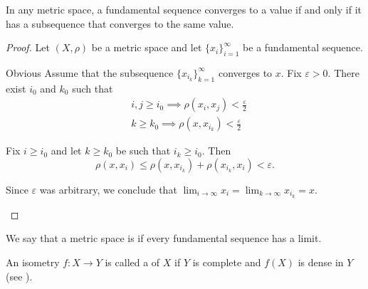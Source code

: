 \begin{proposition}\label{thm:fundamental_subsequence_convergence}
  In any metric space, a fundamental sequence converges to a value if and only if it has a subsequence that converges to the same value.
\end{proposition}
\begin{proof}
  Let \( (X, \rho) \) be a metric space and let \( \{ x_i \}_{i=1}^\infty \) be a fundamental sequence.

  \begin{description}
    \Implies Obvious
    \ImpliedBy Assume that the subsequence \( \{ x_{i_k} \}_{k=1}^\infty \) converges to \( x \). Fix \( \varepsilon > 0 \). There exist \( i_0 \) and \( k_0 \) such that
    \begin{align*}
      &i, j \geq i_0 \implies \rho(x_i, x_j) < \tfrac \varepsilon 2 \\
      &k \geq k_0 \implies \rho(x, x_{i_k}) < \tfrac \varepsilon 2
    \end{align*}

    Fix \( i \geq i_0 \) and let \( k \geq k_0 \) be such that \( i_k \geq i_0 \). Then
    \begin{equation*}
      \rho(x, x_i) \leq \rho(x, x_{i_k}) + \rho(x_{i_k}, x_i) < \varepsilon.
    \end{equation*}

    Since \( \varepsilon \) was arbitrary, we conclude that \( \lim_{i \to \infty} x_i = \lim_{k \to \infty} x_{i_k} = x \).
  \end{description}
\end{proof}

\begin{definition}\label{def:complete_metric_space}
  We say that a metric space is  if every fundamental sequence has a limit.

  An isometry \( f: X \to Y \) is called a  of \( X \) if \( Y \) is complete and \( f(X) \) is dense in \( Y \) (see ).
\end{definition}

